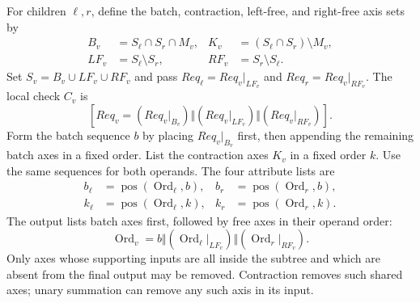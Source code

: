 For children $\ell,r$, define the batch, contraction, left-free, and
right-free axis sets by
\begin{equation}
\begin{aligned}
 B_v&=S_\ell\cap S_r\cap M_v,&
 K_v&=(S_\ell\cap S_r)\setminus M_v,\\
 LF_v&=S_\ell\setminus S_r,&
 RF_v&=S_r\setminus S_\ell.
\end{aligned}
\label{eq:canonical-roles}
\end{equation}
Set $S_v=B_v\cup LF_v\cup RF_v$ and pass
$Req_\ell=Req_v|_{LF_v}$ and $Req_r=Req_v|_{RF_v}$.
The local check $C_v$ is
\begin{equation}
 \left[Req_v=(Req_v|_{B_v})\Vert(Req_v|_{LF_v})\Vert(Req_v|_{RF_v})\right].
 \label{eq:block-order}
\end{equation}
Form the batch sequence $b$ by placing $Req_v|_{B_v}$ first, then appending
the remaining batch axes in a fixed order. List the contraction axes
$K_v$ in a fixed order $k$. Use the same sequences for both operands.
The four attribute lists are
\begin{equation}
\begin{aligned}
 b_\ell&=\operatorname{pos}(\operatorname{Ord}_\ell,b),&
 b_r&=\operatorname{pos}(\operatorname{Ord}_r,b),\\
 k_\ell&=\operatorname{pos}(\operatorname{Ord}_\ell,k),&
 k_r&=\operatorname{pos}(\operatorname{Ord}_r,k).
\end{aligned}
\label{eq:formal-attributes}
\end{equation}
The output lists batch axes first, followed by free axes in their operand
order:
\begin{equation}
 \operatorname{Ord}_v=b\Vert
 (\operatorname{Ord}_\ell|_{LF_v})\Vert
 (\operatorname{Ord}_r|_{RF_v}).
 \label{eq:constructed-order}
\end{equation}
Only axes whose supporting inputs are all inside the subtree and which
are absent from the final output may be removed. Contraction removes
such shared axes; unary summation can remove any such axis in its input.

